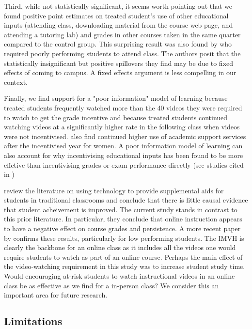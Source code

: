 \documentclass[12pt]{article}
\begin{document}
Third, while not statistically significant, it seems worth pointing out that we found positive point estimates on treated student's use of other educational inputs (attending class, downloading material from the course web page, and attending a tutoring lab) and grades in other courses taken in the same quarter compared to the control group.  This surprising result was also found by \textcite{dgm2010} who required poorly performing students to attend class.  The authors posit that the statistically insignificant but positive spillovers they find may be due to fixed effects of coming to campus. A fixed effects argument is less compelling in our context.    

Finally, we find support for a "poor information" model of learning because treated students frequently watched more than the 40 videos they were required to watch to get the grade incentive and because treated students continued watching videos at a significantly higher rate in the following class when videos were not incentivised. \textcite{lo2009} also find continued higher use of academic support services after the incentivised year for women.  A poor information model of learning can also account for why incentivising educational inputs has been found to be more effetive than incentivising grades or exam performance directly (see studies cited in \textcite{gmr2011})  

\textcite{aws2015} review the literature on using technology to provide supplemental aids for students in traditional classrooms and conclude that there is little causal evidence that student acheivement is improved. The current study stands in contrast to this prior literature.  In particular, they conclude that online instruction appears to have a negative effect on course grades and persistence.  A more recent paper by \textcite{bflt2017} confirms these results, particularly for low performing students. The IMVH is clearly the backbone for an online class as it includes all the videos one would require students to watch as part of an online course. Perhaps the main effect of the video-watching requirement in this study was to increase student study time.  Would encouraging at-risk students to watch instructional videos in an online class be as effective as we find for a in-person class?  We consider this an important area for future research.   


\subsection{Limitations}
\end{document}
